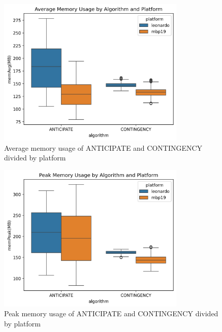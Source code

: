 \documentclass[a4paper,singleside,12pt]{report} %
\begin{document}

\begin{figure}[h!]
    \centering
    \includegraphics[width=0.8\textwidth]{imgs/avg_mem_usage.png}
    \caption{Average memory usage of ANTICIPATE and CONTINGENCY divided by platform}
    \label{fig:avg_mem_usage}
\end{figure}

\begin{figure}[h!]
    \centering
    \includegraphics[width=0.8\textwidth]{imgs/peak_mem_usage.png}
    \caption{Peak memory usage of ANTICIPATE and CONTINGENCY divided by platform}
    \label{fig:peak_mem_usage}
\end{figure}
\end{document}
